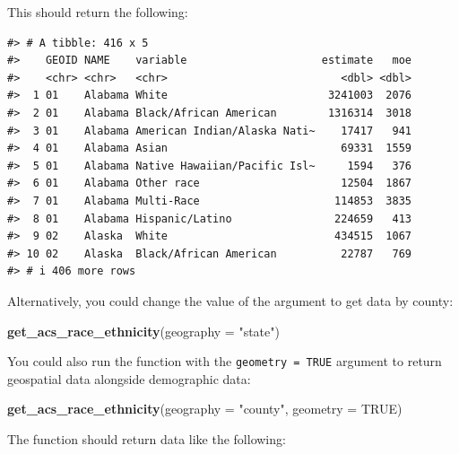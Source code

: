 \documentclass[
]{book}
\newenvironment{Shaded}{\begin{snugshade}}{\end{snugshade}}
\newcommand{\AttributeTok}[1]{\textcolor[rgb]{0.13,0.29,0.53}{#1}}
\newcommand{\ConstantTok}[1]{\textcolor[rgb]{0.56,0.35,0.01}{#1}}
\newcommand{\FunctionTok}[1]{\textcolor[rgb]{0.13,0.29,0.53}{\textbf{#1}}}
\newcommand{\NormalTok}[1]{#1}
\newcommand{\StringTok}[1]{\textcolor[rgb]{0.31,0.60,0.02}{#1}}
\begin{document}
This should return the following:

\begin{verbatim}
#> # A tibble: 416 x 5
#>    GEOID NAME    variable                     estimate   moe
#>    <chr> <chr>   <chr>                           <dbl> <dbl>
#>  1 01    Alabama White                         3241003  2076
#>  2 01    Alabama Black/African American        1316314  3018
#>  3 01    Alabama American Indian/Alaska Nati~    17417   941
#>  4 01    Alabama Asian                           69331  1559
#>  5 01    Alabama Native Hawaiian/Pacific Isl~     1594   376
#>  6 01    Alabama Other race                      12504  1867
#>  7 01    Alabama Multi-Race                     114853  3835
#>  8 01    Alabama Hispanic/Latino                224659   413
#>  9 02    Alaska  White                          434515  1067
#> 10 02    Alaska  Black/African American          22787   769
#> # i 406 more rows
\end{verbatim}

Alternatively, you could change the value of the argument to get data by county:

\begin{Shaded}
\begin{Highlighting}[]
\FunctionTok{get\_acs\_race\_ethnicity}\NormalTok{(}\AttributeTok{geography =} \StringTok{"state"}\NormalTok{)}
\end{Highlighting}
\end{Shaded}

You could also run the function with the \texttt{geometry\ =\ TRUE} argument to return geospatial data alongside demographic data:

\begin{Shaded}
\begin{Highlighting}[]
\FunctionTok{get\_acs\_race\_ethnicity}\NormalTok{(}\AttributeTok{geography =} \StringTok{"county"}\NormalTok{,}
                       \AttributeTok{geometry =} \ConstantTok{TRUE}\NormalTok{)}
\end{Highlighting}
\end{Shaded}

The function should return data like the following:
\end{document}
